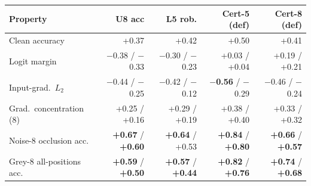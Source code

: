 \begin{tabular}{lrrrr}
\toprule
Property & U8 acc & L5 rob. & Cert-5 (def) & Cert-8 (def) \\
\midrule
Clean accuracy & +0.37 & +0.42 & +0.50 & +0.41 \\
Logit margin & $-$0.38 / $-$0.33 & $-$0.30 / $-$0.23 & +0.03 / +0.04 & +0.19 / +0.21 \\
Input-grad.\ $L_2$ & $-$0.44 / $-$0.25 & $-$0.42 / $-$0.12 & \textbf{$-$0.56} / $-$0.29 & $-$0.46 / $-$0.24 \\
Grad.\ concentration (8) & +0.25 / +0.16 & +0.29 / +0.19 & +0.38 / +0.40 & +0.33 / +0.32 \\
Noise-8 occlusion acc. & \textbf{+0.67} / \textbf{+0.60} & \textbf{+0.64} / +0.53 & \textbf{+0.84} / \textbf{+0.80} & \textbf{+0.66} / \textbf{+0.57} \\
Grey-8 all-positions acc. & \textbf{+0.59} / \textbf{+0.50} & \textbf{+0.57} / \textbf{+0.44} & \textbf{+0.82} / \textbf{+0.76} & \textbf{+0.74} / \textbf{+0.68} \\
\bottomrule
\end{tabular}
